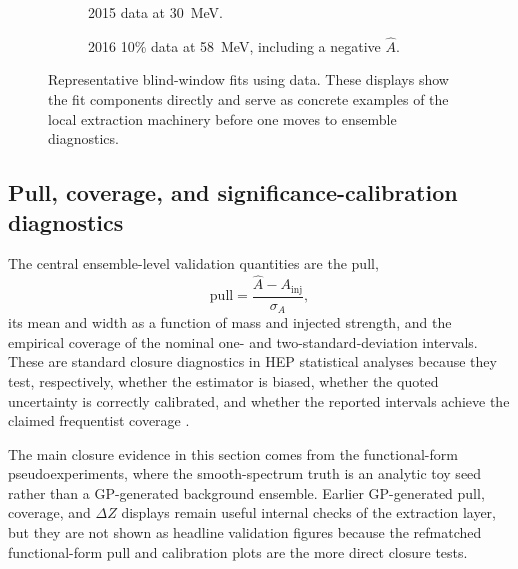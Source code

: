 \begin{figure}[h!]
\centering
\begin{subfigure}[t]{0.88\linewidth}
  \centering
  \caption{2015 data at \SI{30}{MeV}.}
\end{subfigure}

\vspace{1.0em}

\begin{subfigure}[t]{0.88\linewidth}
  \centering
  \caption{2016 10\% data at \SI{58}{MeV}, including a negative $\hat A$.}
\end{subfigure}
\caption{Representative blind-window fits using data. These displays show the fit
components directly and serve as concrete examples of the local extraction machinery
before one moves to ensemble diagnostics.}
\label{fig:data-fit-examples}
\end{figure}

\subsection{Pull, coverage, and significance-calibration diagnostics}

The central ensemble-level validation quantities are the pull,
\begin{equation}
\mathrm{pull} = \frac{\hat A - A_{\mathrm{inj}}}{\sigma_A},
\end{equation}
its mean and width as a function of mass and injected strength, and the empirical
coverage of the nominal one- and two-standard-deviation intervals. These are standard
closure diagnostics in HEP statistical analyses because they test, respectively,
whether the estimator is biased, whether the quoted uncertainty is correctly calibrated,
and whether the reported intervals achieve the claimed frequentist coverage
\cite{Cowan1998,Cowan2011}.

The main closure evidence in this section comes from the functional-form
pseudoexperiments, where
the smooth-spectrum truth is an analytic toy seed rather than a GP-generated background
ensemble. Earlier GP-generated pull, coverage, and $\Delta Z$ displays remain useful
internal checks of the extraction layer, but they are not shown as headline validation
figures because the refmatched functional-form pull and calibration plots are the more
direct closure tests.

